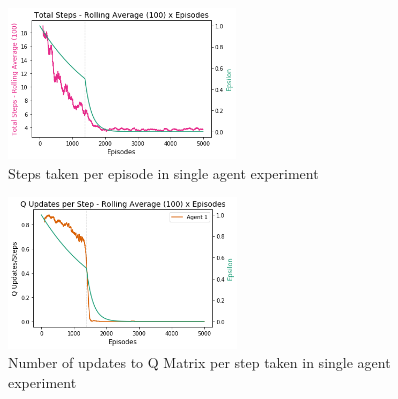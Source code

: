 \documentclass[11pt]{article}
\begin{document}
        \begin{figure}[h]
            \includegraphics[height=4cm]{Images/exp_1/2_total_steps.png}
            \caption{Steps taken per episode in single agent experiment}
            \label{fig:exp1:steps}
        \end{figure}
        \begin{figure}[h]
            \includegraphics[height=4cm]{Images/exp_1/3_updates_per_step.png}
            \caption{Number of updates to Q Matrix per step taken in single agent experiment}
            \label{fig:exp1:updates}
        \end{figure}
\end{document}
